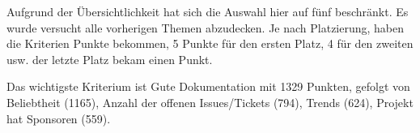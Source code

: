 \noindent
Aufgrund der Übersichtlichkeit hat sich die Auswahl hier auf fünf beschränkt. Es wurde versucht
alle vorherigen Themen abzudecken.
Je nach Platzierung, haben die Kriterien Punkte bekommen, 5 Punkte für den ersten Platz, 4 für den
zweiten usw. der letzte Platz bekam einen Punkt.

Das wichtigste Kriterium ist Gute Dokumentation mit 1329 Punkten, gefolgt von Beliebtheit (1165),
Anzahl der offenen Issues/Tickets (794), Trends (624), Projekt hat Sponsoren (559).
